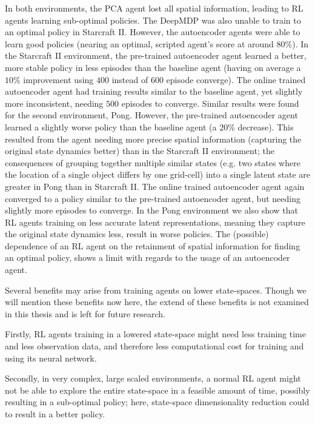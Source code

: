 In both environments, the PCA agent lost all spatial information, leading to RL agents learning sub-optimal policies. The DeepMDP was also unable to train to an optimal policy in Starcraft II. However, the autoencoder agents were able to learn good policies (nearing an optimal, scripted agent's score at around $80\%$). In the Starcraft II environment, the pre-trained autoencoder agent learned a better, more stable policy in less episodes than the baseline agent (having on average a $10\%$ improvement using $400$ instead of $600$ episode converge). The online trained autoencoder agent had training results similar to the baseline agent, yet slightly more inconsistent, needing $500$ episodes to converge. Similar results were found for the second environment, Pong. However, the pre-trained autoencoder agent learned a slightly worse policy than the baseline agent (a $20\%$ decrease). This resulted from the agent needing more precise spatial information (capturing the original state dynamics better) than in the Starcraft II environment; the consequences of grouping together multiple similar states (e.g. two states where the location of a single object differs by one grid-cell) into a single latent state are greater in Pong than in Starcraft II. The online trained autoencoder agent again converged to a policy similar to the pre-trained autoencoder agent, but needing slightly more episodes to converge. In the Pong environment we also show that RL agents training on less accurate latent representations, meaning they capture the original state dynamics less, result in worse policies. The (possible) dependence of an RL agent on the retainment of spatial information for finding an optimal policy, shows a limit with regards to the usage of an autoencoder agent.

Several benefits may arise from training agents on lower state-spaces. Though we will mention these benefits now here, the extend of these benefits is not examined in this thesis and is left for future research.

Firstly, RL agents training in a lowered state-space might need less training time and less observation data, and therefore less computational cost for training and using its neural network. 

Secondly, in very complex, large scaled environments, a normal RL agent might not be able to explore the entire state-space in a feasible amount of time, possibly resulting in a sub-optimal policy; here, state-space dimensionality reduction could to result in a better policy. 


